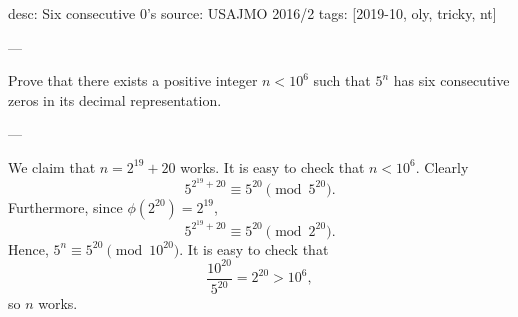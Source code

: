 desc: Six consecutive 0's
source: USAJMO 2016/2
tags: [2019-10, oly, tricky, nt]

---

Prove that there exists a positive integer $n<10^6$ such that $5^n$ has six consecutive zeros in its decimal representation.

---

We claim that $n=2^{19}+20$ works. It is easy to check that $n<10^6$. Clearly \[5^{2^{19}+20}\equiv 5^{20}\pmod{5^{20}}.\]
Furthermore, since $\phi(2^{20})=2^{19}$, \[5^{2^{19}+20}\equiv 5^{20}\pmod{2^{20}}.\]
Hence, $5^n\equiv 5^{20}\pmod{10^{20}}$. It is easy to check that \[\frac{10^{20}}{5^{20}}=2^{20}>10^6,\]
so $n$ works.
